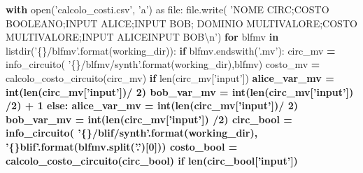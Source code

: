 \documentclass[]{book}
\newenvironment{Shaded}{\begin{snugshade}}{\end{snugshade}}
\newcommand{\BuiltInTok}[1]{#1}
\newcommand{\CharTok}[1]{\textcolor[rgb]{0.31,0.60,0.02}{#1}}
\newcommand{\ControlFlowTok}[1]{\textcolor[rgb]{0.13,0.29,0.53}{\textbf{#1}}}
\newcommand{\DecValTok}[1]{\textcolor[rgb]{0.00,0.00,0.81}{#1}}
\newcommand{\ImportTok}[1]{#1}
\newcommand{\KeywordTok}[1]{\textcolor[rgb]{0.13,0.29,0.53}{\textbf{#1}}}
\newcommand{\NormalTok}[1]{#1}
\newcommand{\OperatorTok}[1]{\textcolor[rgb]{0.81,0.36,0.00}{\textbf{#1}}}
\newcommand{\SpecialCharTok}[1]{\textcolor[rgb]{0.00,0.00,0.00}{#1}}
\newcommand{\StringTok}[1]{\textcolor[rgb]{0.31,0.60,0.02}{#1}}
\begin{document}
\begin{Shaded}
\begin{Highlighting}[]
\ControlFlowTok{with} \BuiltInTok{open}\NormalTok{(}\StringTok{'calcolo_costi.csv'}\NormalTok{, }\StringTok{'a'}\NormalTok{) }\ImportTok{as} \BuiltInTok{file}\NormalTok{:}
  \BuiltInTok{file}\NormalTok{.write(}
    \StringTok{'NOME CIRC;COSTO BOOLEANO;INPUT ALICE;INPUT BOB;}
\StringTok{    DOMINIO MULTIVALORE;COSTO MULTIVALORE;INPUT ALICEINPUT BOB}\CharTok{\textbackslash{}n}\StringTok{'}\NormalTok{)}
  \ControlFlowTok{for}\NormalTok{ blfmv }\KeywordTok{in}\NormalTok{ listdir(}\StringTok{'}\SpecialCharTok{\{\}}\StringTok{/blfmv'}\NormalTok{.}\BuiltInTok{format}\NormalTok{(working_dir)):}
    \ControlFlowTok{if}\NormalTok{ blfmv.endswith(}\StringTok{'.mv'}\NormalTok{):}
\NormalTok{      circ_mv }\OperatorTok{=}\NormalTok{ info_circuito(}
          \StringTok{'}\SpecialCharTok{\{\}}\StringTok{/blfmv/synth'}\NormalTok{.}\BuiltInTok{format}\NormalTok{(working_dir),blfmv)}
\NormalTok{      costo_mv }\OperatorTok{=}\NormalTok{ calcolo_costo_circuito(circ_mv)}
      \ControlFlowTok{if} \BuiltInTok{len}\NormalTok{(circ_mv[}\StringTok{'input'}\NormalTok{]) }\OperatorTok{%
\NormalTok{          alice_var_mv }\OperatorTok{=} \BuiltInTok{int}\NormalTok{(}\BuiltInTok{len}\NormalTok{(circ_mv[}\StringTok{'input'}\NormalTok{])}\OperatorTok{/} \DecValTok{2}\NormalTok{)}
\NormalTok{          bob_var_mv }\OperatorTok{=} \BuiltInTok{int}\NormalTok{(}\BuiltInTok{len}\NormalTok{(circ_mv[}\StringTok{'input'}\NormalTok{]) }\OperatorTok{/}\DecValTok{2}\NormalTok{) }\OperatorTok{+} \DecValTok{1}
      \ControlFlowTok{else}\NormalTok{:}
\NormalTok{          alice_var_mv }\OperatorTok{=} \BuiltInTok{int}\NormalTok{(}\BuiltInTok{len}\NormalTok{(circ_mv[}\StringTok{'input'}\NormalTok{])}\OperatorTok{/} \DecValTok{2}\NormalTok{)}
\NormalTok{          bob_var_mv }\OperatorTok{=} \BuiltInTok{int}\NormalTok{(}\BuiltInTok{len}\NormalTok{(circ_mv[}\StringTok{'input'}\NormalTok{]) }\OperatorTok{/}\DecValTok{2}\NormalTok{)}
\NormalTok{      circ_bool }\OperatorTok{=}\NormalTok{ info_circuito(}
          \StringTok{'}\SpecialCharTok{\{\}}\StringTok{/blif/synth'}\NormalTok{.}\BuiltInTok{format}\NormalTok{(working_dir), }\StringTok{'}\SpecialCharTok{\{\}}\StringTok{blif'}\NormalTok{.}\BuiltInTok{format}\NormalTok{(blfmv.split(}\StringTok{'.'}\NormalTok{)[}\DecValTok{0}\NormalTok{]))}
\NormalTok{      costo_bool }\OperatorTok{=}\NormalTok{ calcolo_costo_circuito(circ_bool)}
      \ControlFlowTok{if} \BuiltInTok{len}\NormalTok{(circ_bool[}\StringTok{'input'}\NormalTok{]) }\OperatorTok{%
}}
\end{Highlighting}
\end{Shaded}
\end{document}
